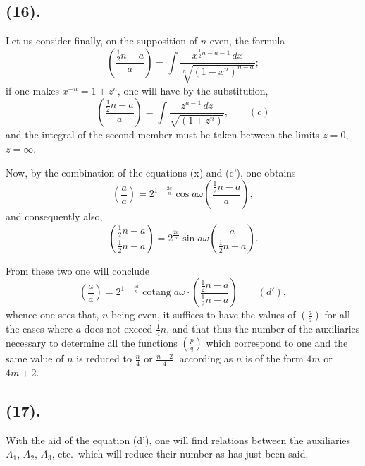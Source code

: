 \documentclass{article}
\begin{document}
\subsection*{(16).}

Let us consider finally, on the supposition of $n$ even, the formula
\[ \left(\frac{\frac{1}{2}n-a}{a}\right)=\int\frac{x^{\frac{1}{2}n-a-1}\,dx}{\sqrt[n]{(1-x^{n})^{n-a}}}; \]
if one makes $x^{-n}=1+z^{n}$, one will have by the substitution,
\[ \left(\frac{\frac{1}{2}n-a}{a}\right)=\int\frac{z^{a-1}\,dz}{\sqrt{(1+z^{n})}},\qquad(c) \]
and the integral of the second member must be taken between the limits $z=0$, $z=\infty$.

Now, by the combination of the equations (x) and (c'), one obtains
\[ \left(\frac{a}{a}\right)=2^{1-\frac{2a}{n}}\cos a\omega\left(\frac{\frac{1}{2}n-a}{a}\right), \]
and consequently also,
\[ \left(\frac{\frac{1}{2}n-a}{\frac{1}{2}n-a}\right)=2^{\frac{2a}{n}}\sin a\omega\left(\frac{a}{\frac{1}{2}n-a}\right). \]

From these two one will conclude
\[ \left(\frac{a}{a}\right)=2^{1-\frac{4a}{n}}\operatorname{cotang}a\omega\cdot\left(\frac{\frac{1}{2}n-a}{\frac{1}{2}n-a}\right)\qquad(d'), \]
whence one sees that, $n$ being even, it suffices to have the values of $\left(\frac{a}{a}\right)$ for all the cases where $a$ does not exceed $\frac{1}{4}n$, and that thus the number of the auxiliaries necessary to determine all the functions $\left(\frac{p}{q}\right)$ which correspond to one and the same value of $n$ is reduced to $\frac{n}{4}$ or $\frac{n-2}{4}$, according as $n$ is of the form $4m$ or $4m+2$.

\subsection*{(17).}

With the aid of the equation (d'), one will find relations between the auxiliaries $A_{1}$, $A_{2}$, $A_{3}$, etc.\ which will reduce their number as has just been said.
\end{document}
